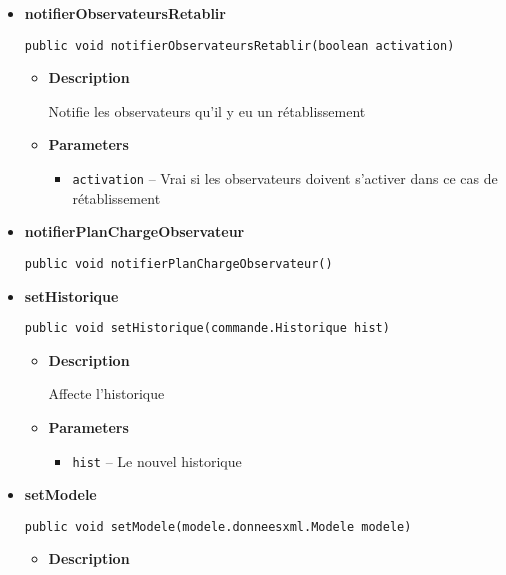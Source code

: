 \documentclass[11pt,a4paper]{report}
\begin{document}
{{{{{{\begin{itemize}
{\begin{itemize}
{Notifie les observateurs du changemetn du modèle
}
\end{itemize}
}%
\item{ 
\hypertarget{controleur.ControleurDonnees.notifierObservateursRetablir(boolean)}{{\bf  notifierObservateursRetablir}\\}
\begin{lstlisting}[frame=none]
public void notifierObservateursRetablir(boolean activation)\end{lstlisting} %
\begin{itemize}
\item{
{\bf  Description}

Notifie les observateurs qu'il y eu un rétablissement
}
\item{
{\bf  Parameters}
  \begin{itemize}
   \item{
\texttt{activation} -- Vrai si les observateurs doivent s'activer dans ce cas de rétablissement}
  \end{itemize}
}%
\end{itemize}
}%
\item{ 
\hypertarget{controleur.ControleurDonnees.notifierPlanChargeObservateur()}{{\bf  notifierPlanChargeObservateur}\\}
\begin{lstlisting}[frame=none]
public void notifierPlanChargeObservateur()\end{lstlisting} %
}%
\item{ 
\hypertarget{controleur.ControleurDonnees.setHistorique(controleur.commande.Historique)}{{\bf  setHistorique}\\}
\begin{lstlisting}[frame=none]
public void setHistorique(commande.Historique hist)\end{lstlisting} %
\begin{itemize}
\item{
{\bf  Description}

Affecte l'historique
}
\item{
{\bf  Parameters}
  \begin{itemize}
   \item{
\texttt{hist} -- Le nouvel historique}
  \end{itemize}
}%
\end{itemize}
}%
\item{ 
\hypertarget{controleur.ControleurDonnees.setModele(modele.donneesxml.Modele)}{{\bf  setModele}\\}
\begin{lstlisting}[frame=none]
public void setModele(modele.donneesxml.Modele modele)\end{lstlisting} %
\begin{itemize}
\item{
{\bf  Description}

}
\end{itemize}}
\end{itemize}}}}}}}
\end{document}
